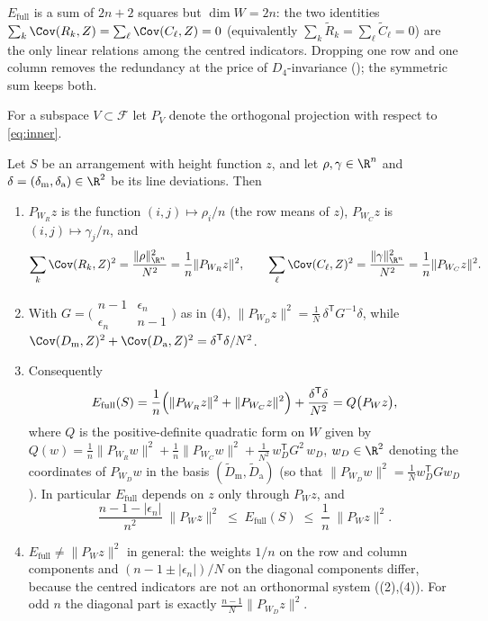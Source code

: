 \begin{remark}
\label{rem:redundancy}
$E_{\mathrm{full}}$ is a sum of $2n+2$ squares but $\dim W=2n$: the two identities
$\sum_k\Cov(R_k,Z)=\sum_\ell\Cov(C_\ell,Z)=0$ (equivalently $\sum_k\tilde R_k=\sum_\ell\tilde C_\ell=0$)
are the only linear relations among the centred indicators.  Dropping one row and one column removes the
redundancy at the price of $D_4$-invariance (); the symmetric sum keeps both.
\end{remark}

For a subspace $V\subset\mathcal F$ let $P_V$ denote the orthogonal projection with respect to \eqref{eq:inner}.

\begin{lemma}
\label{lem:projection}
Let $S$ be an arrangement with height function $z$, and let $\rho,\gamma\in\R^{n}$ and
$\delta=(\delta_{\mathrm m},\delta_{\mathrm a})\in\R^{2}$ be its line deviations.  Then
\begin{enumerate}
\item $P_{W_R}z$ is the function $(i,j)\mapsto\rho_i/n$ (the row means of $z$), $P_{W_C}z$ is $(i,j)\mapsto\gamma_j/n$, and
\[
\sum_{k}\Cov(R_k,Z)^{2}=\frac{\|\rho\|_{\R^{n}}^{2}}{N^{2}}=\frac1n\|P_{W_R}z\|^{2},\qquad
\sum_{\ell}\Cov(C_\ell,Z)^{2}=\frac{\|\gamma\|_{\R^{n}}^{2}}{N^{2}}=\frac1n\|P_{W_C}z\|^{2}.
\]
\item With $G=\bigl(\begin{smallmatrix}n-1&\epsilon_n\\ \epsilon_n&n-1\end{smallmatrix}\bigr)$ as in (4),
$\|P_{W_D}z\|^{2}=\frac1N\,\delta^{\mathsf T}G^{-1}\delta$, while
$\Cov(D_{\mathrm m},Z)^{2}+\Cov(D_{\mathrm a},Z)^{2}=\delta^{\mathsf T}\delta/N^{2}$.
\item Consequently
\begin{equation}
E_{\mathrm{full}}(S)=\frac1n\Bigl(\|P_{W_R}z\|^{2}+\|P_{W_C}z\|^{2}\Bigr)+\frac{\delta^{\mathsf T}\delta}{N^{2}}
=Q\bigl(P_Wz\bigr),
\label{eq:Efull_projection}
\end{equation}
where $Q$ is the positive-definite quadratic form on $W$ given by
$Q(w)=\frac1n\|P_{W_R}w\|^{2}+\frac1n\|P_{W_C}w\|^{2}+\frac1{N^{2}}\,w_D^{\mathsf T}G^{2}\,w_D$,
$w_D\in\R^{2}$ denoting the coordinates of $P_{W_D}w$ in the basis $(\tilde D_{\mathrm m},\tilde D_{\mathrm a})$
(so that $\|P_{W_D}w\|^{2}=\frac1N w_D^{\mathsf T}Gw_D$).
In particular $E_{\mathrm{full}}$ depends on $z$ only through $P_Wz$, and
\begin{equation}
\frac{n-1-|\epsilon_n|}{n^{2}}\;\|P_Wz\|^{2}\;\le\;E_{\mathrm{full}}(S)\;\le\;\frac1n\;\|P_Wz\|^{2}.
\label{eq:Efull_bounds}
\end{equation}
\item $E_{\mathrm{full}}\ne\|P_Wz\|^{2}$ in general: the weights $1/n$ on the row and column components and
$(n-1\pm|\epsilon_n|)/N$ on the diagonal components differ, because the centred indicators are not an
orthonormal system ((2),(4)).  For odd $n$ the diagonal part is exactly
$\frac{n-1}{N}\|P_{W_D}z\|^{2}$.
\end{enumerate}
\end{lemma}

